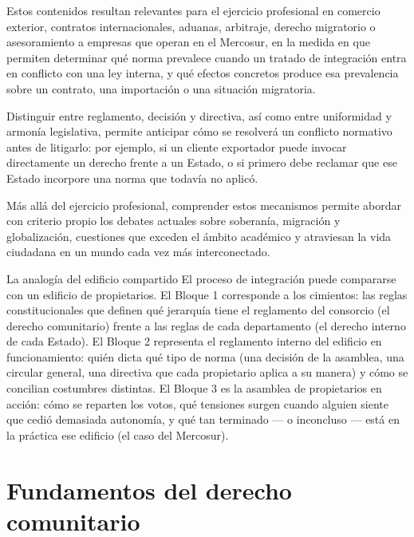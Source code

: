 \documentclass[12pt,oneside]{book}
\begin{document}
Estos contenidos resultan relevantes para el ejercicio profesional en comercio exterior, contratos internacionales, aduanas, arbitraje, derecho migratorio o asesoramiento a empresas que operan en el Mercosur, en la medida en que permiten determinar qué norma prevalece cuando un tratado de integración entra en conflicto con una ley interna, y qué efectos concretos produce esa prevalencia sobre un contrato, una importación o una situación migratoria.

Distinguir entre reglamento, decisión y directiva, así como entre uniformidad y armonía legislativa, permite anticipar cómo se resolverá un conflicto normativo antes de litigarlo: por ejemplo, si un cliente exportador puede invocar directamente un derecho frente a un Estado, o si primero debe reclamar que ese Estado incorpore una norma que todavía no aplicó.

Más allá del ejercicio profesional, comprender estos mecanismos permite abordar con criterio propio los debates actuales sobre soberanía, migración y globalización, cuestiones que exceden el ámbito académico y atraviesan la vida ciudadana en un mundo cada vez más interconectado.

\begin{example}{La analogía del edificio compartido}
El proceso de integración puede compararse con un edificio de propietarios. El Bloque 1 corresponde a los cimientos: las reglas constitucionales que definen qué jerarquía tiene el reglamento del consorcio (el derecho comunitario) frente a las reglas de cada departamento (el derecho interno de cada Estado). El Bloque 2 representa el reglamento interno del edificio en funcionamiento: quién dicta qué tipo de norma (una decisión de la asamblea, una circular general, una directiva que cada propietario aplica a su manera) y cómo se concilian costumbres distintas. El Bloque 3 es la asamblea de propietarios en acción: cómo se reparten los votos, qué tensiones surgen cuando alguien siente que cedió demasiada autonomía, y qué tan terminado --- o inconcluso --- está en la práctica ese edificio (el caso del Mercosur).
\end{example}

\chapter{Fundamentos del derecho comunitario}
\end{document}
